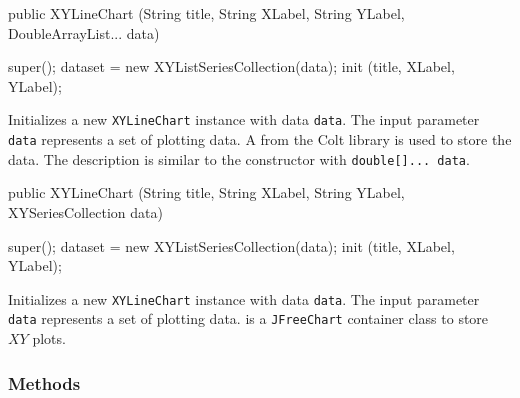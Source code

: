 \begin{code}

   public XYLineChart (String title, String XLabel, String YLabel,
                       DoubleArrayList... data) \begin{hide} {
      super();
      dataset = new XYListSeriesCollection(data);
      init (title, XLabel, YLabel);
   }\end{hide}
\end{code}
\begin{tabb}
   Initializes a new \texttt{XYLineChart} instance with data \texttt{data}.
   The input parameter \texttt{data} represents a set of plotting data. A
    from the Colt library is
   used to store the data. The description is similar to the
   constructor   with \texttt{double[]... data}.
\end{tabb}
\begin{htmlonly}
\end{htmlonly}
\begin{code}

   public XYLineChart (String title, String XLabel, String YLabel,
                       XYSeriesCollection data) \begin{hide} {
      super();
      dataset = new XYListSeriesCollection(data);
      init (title, XLabel, YLabel);
   }\end{hide}
\end{code}
\begin{tabb}
   Initializes a new \texttt{XYLineChart} instance with data \texttt{data}.
   The input parameter \texttt{data} represents a set of plotting data.
    is a
   \texttt{JFreeChart} container class to store $XY$ plots.
\end{tabb}
\begin{htmlonly}
\end{htmlonly}

\subsubsection*{Methods}

